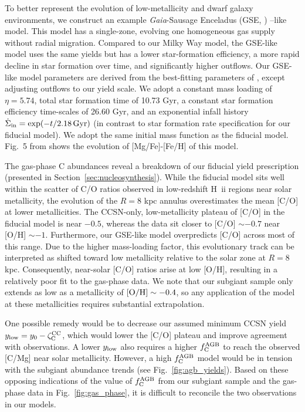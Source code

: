 \documentclass[fleqn,
usenatbib]{mnras}
\newcommand{\Hii}{H~{\sc ii}}
\newcommand{\fagb}{f_{\rm C}^{\rm AGB}}
\newcommand{\yo}{y_0}
\newcommand{\zcc}{\zeta_{\rm C}^{\rm CC}}
\begin{document}
{To better represent the evolution of low-metallicity and dwarf galaxy environments, we construct an example {\it Gaia}-Sausage Enceladus (GSE, \citealt{meza+05, belokurov+18, helmi18}) --like model. This model has a single-zone,  evolving one homogeneous gas supply without radial migration. Compared to our Milky Way model, the GSE-like model uses the same yields but has a lower star-formation efficiency, a more rapid decline in star formation over time, and significantly higher outflows.
Our GSE-like model parameters are derived from the best-fitting parameters of \citet{james_dwarfs}, except adjusting outflows to our yield scale. We adopt a constant mass loading of $\eta=5.74$, total star formation time of 10.73 Gyr, a constant star formation efficiency time-scales of 26.60 Gyr, and an exponential infall history $\dot \Sigma_{\rm in} = \exp(-t / 2.18\,{\rm Gyr})$ (in contrast to star formation rate specification for our fiducial model). We adopt the same \citet{kroupa01} initial mass function as the fiducial model. Fig.~5 from \citet{james_dwarfs} shows the evolution of [Mg/Fe]-[Fe/H] of this model.

The gas-phase C abundances reveal a breakdown of our fiducial yield prescription (presented in Section~\ref{sec:nucleosynthesis}). While the fiducial model sits well within the scatter of C/O ratios observed in low-redshift \Hii{} regions near solar metallicity, the evolution of the $R = 8$ kpc annulus overestimates the mean [C/O] at lower metallicities. The CCSN-only, low-metallicity plateau of [C/O] in the fiducial model is near $-0.5$, whereas the data sit closer to [C/O] $\sim -0.7$ near [O/H] $\sim - 1$. Furthermore, our GSE-like model overpredicts [C/O] across most of this range. Due to the higher mass-loading factor, this evolutionary track can be interpreted as shifted toward low metallicity relative to the solar zone at $R = 8$ kpc. Consequently, near-solar [C/O] ratios arise at low [O/H], resulting in a relatively poor fit to the gas-phase data. We note that our subgiant sample only extends as low as a metallicity of ${\rm [O/H]} \sim -0.4$, so any application of the model at these metallicities requires substantial extrapolation. 

One possible remedy would be to decrease our assumed minimum CCSN yield $y_{\rm low} = \yo - \zcc$, which would lower the [C/O] plateau and improve agreement with observations. A lower $y_{\rm low}$ also requires a higher $\fagb{}$ to reach the observed [C/Mg] near solar metallicity. However, a high $\fagb{}$ model would be in tension with the subgiant abundance trends (see Fig.~\ref{fig:agb_yields}). 
Based on these opposing indications of the value of $\fagb$ from our subgiant sample and the gas-phase data in Fig.~\ref{fig:gas_phase}, it is difficult to reconcile the two observations in our models.

}
\end{document}
